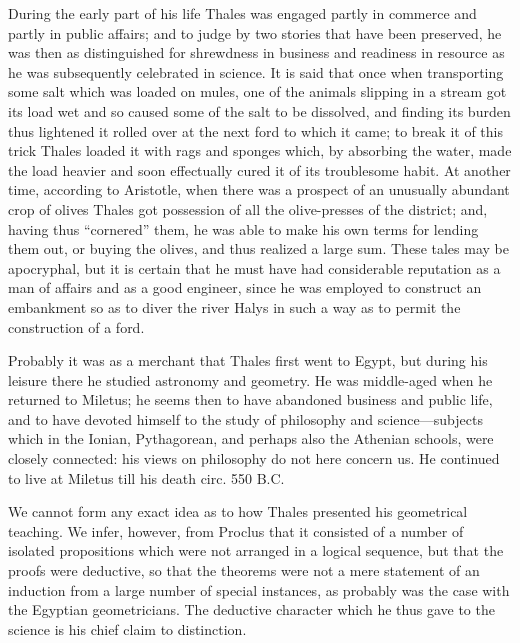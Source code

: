 \documentclass[12pt,oneside]{book}
\begin{document}
During the early part of his life Thales was engaged partly in commerce and partly in public affairs; and to judge by two stories that have been preserved, he was then as distinguished for shrewdness in business and readiness in resource as he was subsequently celebrated in science. It is said that once when transporting some salt which was loaded on mules, one of the animals slipping in a stream got its load wet and so caused some of the salt to be dissolved, and finding its burden thus lightened it rolled over at the next ford to which it came; to break it of this trick Thales loaded it with rags and sponges which, by absorbing the water, made the load heavier and soon effectually cured it of its troublesome habit. At another time, according to Aristotle, when there was a prospect of an unusually abundant crop of olives Thales got possession of all the olive-presses of the district; and, having thus ``cornered'' them, he was able to make his own terms for lending them out, or buying the olives, and thus realized a large sum. These tales may be apocryphal, but it is certain that he must have had considerable reputation as a man of affairs and as a good engineer, since he was employed to construct an embankment so as to diver the river Halys in such a way as to permit the construction of a ford. \par 

Probably it was as a merchant that Thales first went to Egypt, but during his leisure there he studied astronomy and geometry. He was middle-aged when he returned to Miletus; he seems then to have abandoned business and public life, and to have devoted himself to the study of philosophy and science---subjects which in the Ionian, Pythagorean, and perhaps also the Athenian schools, were closely connected: his views on philosophy do not here concern us. He continued to live at Miletus till his death circ. 550 B.C. \par 

We cannot form any exact idea as to how Thales presented his geometrical teaching. We infer, however, from Proclus that it consisted of a number of isolated propositions which were not arranged in a logical sequence, but that the proofs were deductive, so that the theorems were not a mere statement of an induction from a large number of special instances, as probably was the case with the Egyptian geometricians. The deductive character which he thus gave to the science is his chief claim to distinction. \par 
\end{document}

